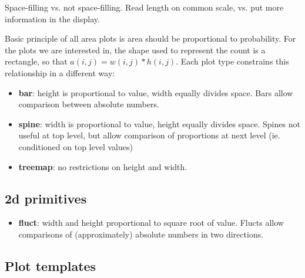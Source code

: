 \documentclass[letterpaper,oneside]{scrartcl}
\begin{document}
Space-filling vs. not space-filling.  Read length on common scale, vs. put more information in the display.

Basic principle of all area plots is area should be proportional to probability. For the plots we are interested in, the shape used to represent the count is a rectangle, so that $a(i, j) = w(i, j) * h(i, j)$. Each plot type constrains this relationship in a different way:

\begin{itemize}
  \item {\bf bar}: height is proportional to value, width equally divides space. Bars allow comparison between absolute numbers.

  \item {\bf spine}: width is proportional to value, height equally divides space. Spines not useful at top level, but allow comparison of proportions at next level (ie. conditioned on top level values)

  \item {\bf treemap}: no restrictions on height and width.

\end{itemize}

\subsection{2d primitives}

\begin{itemize}
  \item {\bf fluct}: width and height proportional to square root of value. Flucts allow comparisons of (approximately) absolute numbers in two directions. 
  
\end{itemize}

\subsection{Plot templates}
\end{document}
